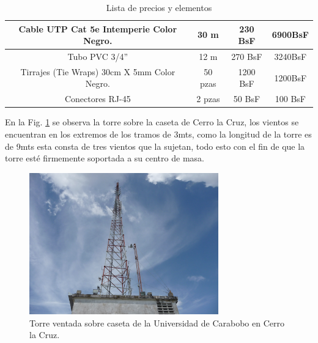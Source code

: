 \documentclass[11pt, a4paper, twosides]{report}
\begin{document}
\begin{enumerate}
\begin{table}[h]
{\begin{tabular}{| c | c | c | c | }
         Cable UTP Cat 5e Intemperie Color Negro. & 30 m & 230 BsF & 6900BsF \\ \hline
         Tubo PVC 3/4'' & 12 m & 270 BsF & 3240BsF \\ \hline
         Tirrajes (Tie Wraps) 30cm X 5mm Color Negro. & 50 pzas & 1200 BsF & 1200BsF\\ \hline
         Conectores RJ-45 & 2 pzas & 50 BsF & 100 BsF \\
        \hline
        \end{tabular}}
        \caption{Lista de precios y elementos}
         \label{tab:5}
    
    \end{table}
\end{enumerate}
En la Fig. \ref{fig:tower} se observa la torre sobre la caseta de Cerro la Cruz, los vientos se encuentran en los extremos de los tramos de 3mts, como la longitud de la torre es de 9mts esta consta de tres vientos que la sujetan, todo esto con el fin de que la torre esté firmemente soportada a su centro de masa. 
\begin{figure}[h]
    \centering
    \includegraphics[width=0.728\textwidth]{cerro_la_cruz_1.jpg}
    \caption{Torre ventada sobre caseta de la Universidad de Carabobo en Cerro la Cruz.}
    \label{fig:tower}
\end{figure}
\end{document}
